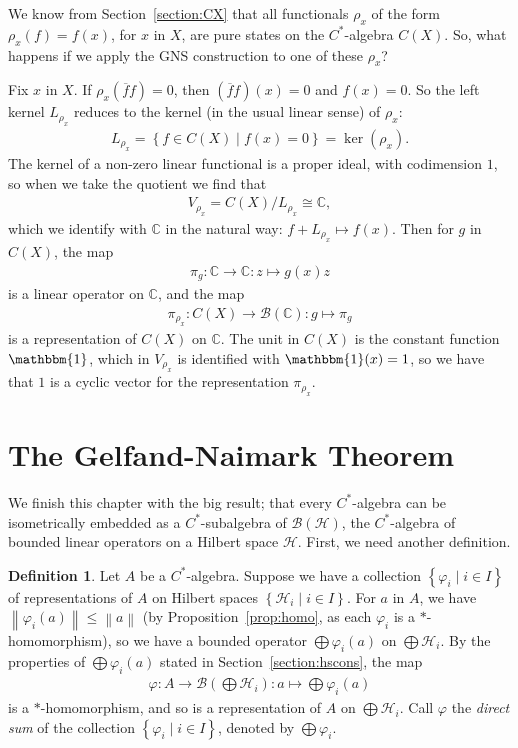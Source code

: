 \documentclass[11pt,a4paper]{report}
\theoremstyle{plain}
\theoremstyle{definition}
\newtheorem*{defn}{Definition}
\newcommand{\1}{\mathbbm{1}}
\newcommand{\C}{\mathbb{C}}
\renewcommand{\H}{\mathcal{H}}
\newcommand{\B}{\mathcal{B}}
\newcommand{\BH}{\mathcal{\B(\H)}}
\renewcommand{\phi}{\varphi}
\newcommand{\CX}{C(X)}
\renewcommand{\bar}{\overline}
\renewcommand{\oplus}{\textstyle\bigoplus}
\begin{document}
We know from Section~\ref{section:CX} that all functionals $\rho_x$ of the form 
$\rho_x(f) = f(x)$, for $x$ in $X$, are pure states on the $C^\ast$-algebra 
$\CX$. So, what happens if we apply the GNS construction to one of these 
$\rho_x$?

Fix $x$ in $X$. If $\rho_x(\bar f f)=0$, then $(\bar f f)(x)=0$ and $f(x)=0$. 
So the left kernel $L_{\rho_x}$ reduces to the kernel (in the usual linear 
sense) of $\rho_x$:
\begin{align*}
	L_{\rho_x} = \left\{f\in\CX \mid f(x) = 0\right\} = \ker(\rho_x).
\end{align*}
The kernel of a non-zero linear functional is a proper ideal, with codimension 
$1$, so when we take the quotient we find that 
\begin{align*}
	V_{\rho_x} = \CX/L_{\rho_x} \cong \C,
\end{align*}
which we identify with $\C$ in the natural way: $f+L_{\rho_x} \mapsto f(x)$.
Then for $g$ in $\CX$, the map 
\begin{align*}
	\pi_g:\C\to\C:z\mapsto g(x)z
\end{align*} 
is a linear operator on $\C$, and the map 
\begin{align*}
	\pi_{\rho_x}:\CX\to\B(\C):g\mapsto\pi_g
\end{align*} 
is a representation of $\CX$ on $\C$. The unit in $\CX$ is the constant function 
$\1$, which in $V_{\rho_x}$ is identified with $\1(x)=1$, so we have that $1$ is 
a cyclic vector for the representation $\pi_{\rho_x}$.


\section{The Gelfand-Naimark Theorem}\label{section:gn}
We finish this chapter with the big result; that every $C^\ast$-algebra can be 
isometrically embedded as a $C^\ast$-subalgebra of $\BH$, the $C^\ast$-algebra 
of bounded linear operators on a Hilbert space $\H$. First, we need another 
definition.
\begin{defn}
	Let $A$ be a $C^\ast$-algebra. Suppose we have a collection $\left\{\phi_i \mid 
	i\in I\right\}$ of representations of $A$ on Hilbert spaces $\left\{\H_i \mid 
	i\in I\right\}$. For $a$ in $A$, we have $\left\|\phi_i(a)\right\| \leq 
	\left\|a\right\|$ (by Proposition~\ref{prop:homo}, as each $\phi_i$ is a 
	$\ast$-homomorphism), so we have a bounded operator $\oplus\phi_i(a)$ on $\oplus 
	\H_i$. By the properties of $\oplus\phi_i(a)$ 
	stated in Section~\ref{section:hscons}, the map
	\begin{align*}
		\phi:A\to \B(\oplus\H_i):a\mapsto\oplus\phi_i(a)
	\end{align*}
	is a $\ast$-homomorphism, and so is a representation of $A$ on $\oplus\H_i$. 
	Call $\phi$ the \emph{direct sum} of the collection $\left\{\phi_i \mid i\in 
	I\right\}$, denoted by $\oplus\phi_i$.
\end{defn}
\end{document}
